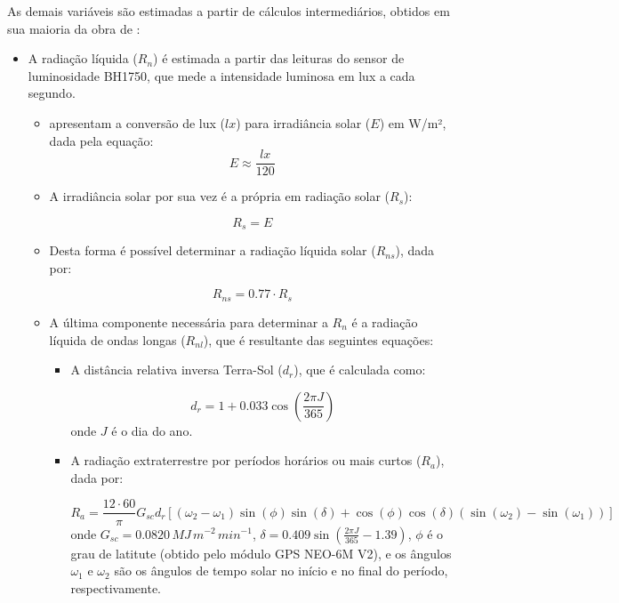 As demais variáveis são estimadas a partir de cálculos intermediários, obtidos em sua maioria da obra de \textcite{Allen_evapotranspiration1998}:
\begin{itemize}
    \item A radiação líquida (\(R_n\)) é estimada a partir das leituras do sensor de luminosidade BH1750, que mede a intensidade luminosa em lux a cada segundo. 
    \begin{itemize}
        \item \textcite{Michael_2020} apresentam a conversão de lux (\(lx\)) para irradiância solar (\(E\)) em W/m², dada pela equação:
        \[ E \approx \frac{lx}{120} \]

        \item A irradiância solar por sua vez é a própria em radiação solar (\(R_s\)):
        
        \[ R_s = E \]

        \item Desta forma é possível determinar a radiação líquida solar (\(R_{ns}\)), dada por:
        
        \[ R_{ns} = 0.77 \cdot R_s \]

        \item A última componente necessária para determinar a \(R_n\) é a radiação líquida de ondas longas (\(R_{nl}\)), que é resultante das seguintes equações:
        
        \begin{itemize}
            \item A distância relativa inversa Terra-Sol (\(d_r\)), que é calculada como:
            
            \[
            d_r = 1 + 0.033 \cos\left( \frac{2 \pi J}{365} \right)
            \]
            onde \(J\) é o dia do ano.
            
            \item A radiação extraterrestre por períodos horários ou mais curtos (\(R_a\)), dada por:
            
            \[
            R_a = \frac{12 \cdot 60}{\pi} G_{sc} d_r 
            \left[ 
            (\omega_2 - \omega_1) \sin(\phi) \sin(\delta) + 
            \cos(\phi) \cos(\delta) (\sin(\omega_2) - \sin(\omega_1)) 
            \right]
            \]
            onde \(G_{sc} = 0.0820 \, MJ \, m^{-2} \, min^{-1}\), \( \delta = 0.409 \sin\left( \frac{2 \pi J}{365} - 1.39 \right)\), \(\phi\) é o grau de latitute (obtido pelo módulo GPS NEO-6M V2), e os ângulos \( \omega_1 \) e \( \omega_2 \) são os ângulos de tempo solar no início e no final do período, respectivamente.
            

\end{itemize}
\end{itemize}
\end{itemize}
